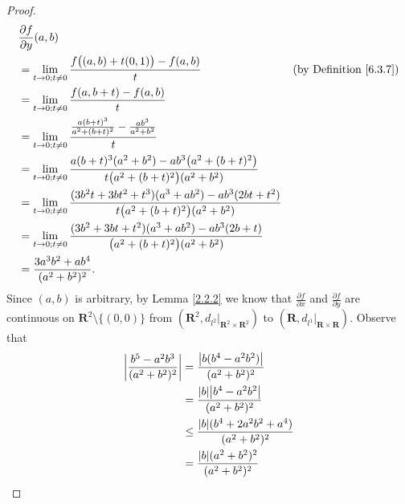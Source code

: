 \begin{proof}
\begin{align*}
         & \frac{\partial f}{\partial y}(a, b)                                                                                                                                          \\
         & = \lim_{t \to 0 ; t \neq 0} \frac{f\big((a, b) + t(0, 1)\big) - f(a, b)}{t}                                                             & \text{(by Definition \ref{6.3.7})} \\
         & = \lim_{t \to 0 ; t \neq 0} \frac{f(a, b + t) - f(a, b)}{t}                                                                                                                  \\
         & = \lim_{t \to 0 ; t \neq 0} \frac{\frac{a (b + t)^3}{a^2 + (b + t)^2} - \frac{ab^3}{a^2 + b^2}}{t}                                                                           \\
         & = \lim_{t \to 0 ; t \neq 0} \frac{a (b + t)^3 (a^2 + b^2) - a b^3 \big(a^2 + (b + t)^2\big)}{t \big(a^2 + (b + t)^2\big) (a^2 + b^2)}                                        \\
         & = \lim_{t \to 0 ; t \neq 0} \frac{(3 b^2 t + 3 b t^2 + t^3) (a^3 + a b^2) - a b^3 (2bt + t^2)}{t \big(a^2 + (b + t)^2\big) (a^2 + b^2)}                                      \\
         & = \lim_{t \to 0 ; t \neq 0} \frac{(3 b^2 + 3 b t + t^2) (a^3 + a b^2) - a b^3 (2b + t)}{\big(a^2 + (b + t)^2\big) (a^2 + b^2)}                                               \\
         & = \frac{3 a^3 b^2 + a b^4}{(a^2 + b^2)^2}.
    \end{align*}
    Since \((a, b)\) is arbitrary, by Lemma \ref{2.2.2} we know that \(\frac{\partial f}{\partial x}\) and \(\frac{\partial f}{\partial y}\) are continuous on \(\mathbf{R}^2 \setminus \{(0, 0)\}\) from \((\mathbf{R}^2, d_{l^2}|_{\mathbf{R}^2 \times \mathbf{R}^2})\) to \((\mathbf{R}, d_{l^1}|_{\mathbf{R} \times \mathbf{R}})\).
    Observe that
    \begin{align*}
        \abs*{\frac{b^5 - a^2 b^3}{(a^2 + b^2)^2}} & = \frac{\abs*{b (b^4 - a^2 b^2)}}{(a^2 + b^2)^2}            \\
                                                   & = \frac{\abs*{b} \abs*{b^4 - a^2 b^2}}{(a^2 + b^2)^2}       \\
                                                   & \leq \frac{\abs*{b} (b^4 + 2 a^2 b^2 + a^4)}{(a^2 + b^2)^2} \\
                                                   & = \frac{\abs*{b} (a^2 + b^2)^2}{(a^2 + b^2)^2}              \\

\end{align*}
\end{proof}
